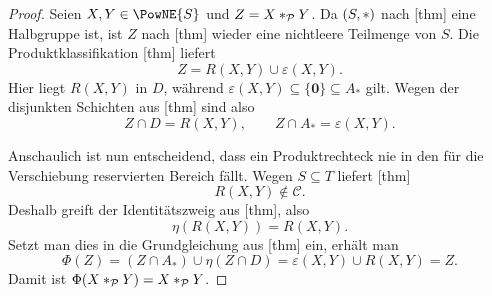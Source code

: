 \documentclass[main.tex]{subfiles}
\begin{document}
\begin{proof}
Seien \(X,Y\in\PowNE{S}\) und \(Z=X\mathbin{\ast}_{\mathcal P}Y\). Da
\((S,\mathbin{\ast})\) nach
[thm] eine Halbgruppe ist,
ist \(Z\) nach [thm] wieder eine
nichtleere Teilmenge von \(S\). Die Produktklassifikation
[thm] liefert
\[
  Z=R(X,Y)\cup\varepsilon(X,Y).
\]
Hier liegt \(R(X,Y)\) in \(D\), während
\(\varepsilon(X,Y)\subseteq\{\mathbf0\}\subseteq A_*\) gilt. Wegen der
disjunkten Schichten aus
[thm] sind also
\[
  Z\cap D=R(X,Y),
  \qquad
  Z\cap A_*=\varepsilon(X,Y).
\]

Anschaulich ist nun entscheidend, dass ein Produktrechteck nie in den für
die Verschiebung reservierten Bereich fällt. Wegen \(S\subseteq T\) liefert
[thm]
\[
  R(X,Y)\notin\mathcal C.
\]
Deshalb greift der Identitätszweig aus
[thm], also
\[
  \eta(R(X,Y))=R(X,Y).
\]
Setzt man dies in die Grundgleichung aus
[thm] ein, erhält man
\[
  \Phi(Z)
  =(Z\cap A_*)\cup\eta(Z\cap D)
  =\varepsilon(X,Y)\cup R(X,Y)
  =Z.
\]
Damit ist
\(\Phi(X\mathbin{\ast}_{\mathcal P}Y)=X\mathbin{\ast}_{\mathcal P}Y\).
\end{proof}
\end{document}
